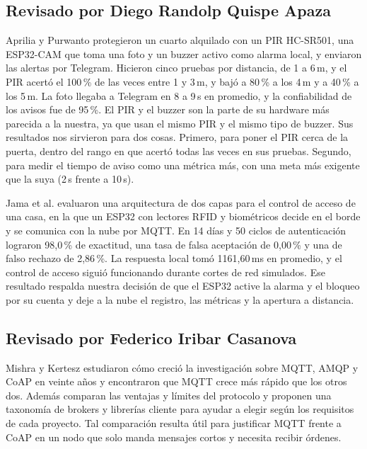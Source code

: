 \documentclass[manuscript,screen,nonacm]{acmart}
\begin{document}
\subsection{Revisado por Diego Randolp Quispe Apaza}
Aprilia y Purwanto \cite{aprilia2025boarding} protegieron un cuarto alquilado con un PIR HC-SR501, una ESP32-CAM que toma una foto y un buzzer activo como alarma local, y enviaron las alertas por Telegram. Hicieron cinco pruebas por distancia, de 1 a 6\,m, y el PIR acertó el 100\,\% de las veces entre 1 y 3\,m, y bajó a 80\,\% a los 4\,m y a 40\,\% a los 5\,m. La foto llegaba a Telegram en 8 a 9\,s en promedio, y la confiabilidad de los avisos fue de 95\,\%. El PIR y el buzzer son la parte de su hardware más parecida a la nuestra, ya que usan el mismo PIR y el mismo tipo de buzzer. Sus resultados nos sirvieron para dos cosas. Primero, para poner el PIR cerca de la puerta, dentro del rango en que acertó todas las veces en sus pruebas. Segundo, para medir el tiempo de aviso como una métrica más, con una meta más exigente que la suya (2\,s frente a 10\,s).

Jama et al. \cite{jama2026edge} evaluaron una arquitectura de dos capas para el control de acceso de una casa, en la que un ESP32 con lectores RFID y biométricos decide en el borde y se comunica con la nube por MQTT. En 14 días y 50 ciclos de autenticación lograron 98,0\,\% de exactitud, una tasa de falsa aceptación de 0,00\,\% y una de falso rechazo de 2,86\,\%. La respuesta local tomó 1161,60\,ms en promedio, y el control de acceso siguió funcionando durante cortes de red simulados. Ese resultado respalda nuestra decisión de que el ESP32 active la alarma y el bloqueo por su cuenta y deje a la nube el registro, las métricas y la apertura a distancia.

\subsection{Revisado por Federico Iribar Casanova}
Mishra y Kertesz \cite{mishra2020mqtt} estudiaron cómo creció la investigación sobre MQTT, AMQP y CoAP en veinte años y encontraron que MQTT crece más rápido que los otros dos. Además comparan las ventajas y límites del protocolo y proponen una taxonomía de brokers y librerías cliente para ayudar a elegir según los requisitos de cada proyecto. Tal comparación resulta útil para justificar MQTT frente a CoAP en un nodo que solo manda mensajes cortos y necesita recibir órdenes.
\end{document}
